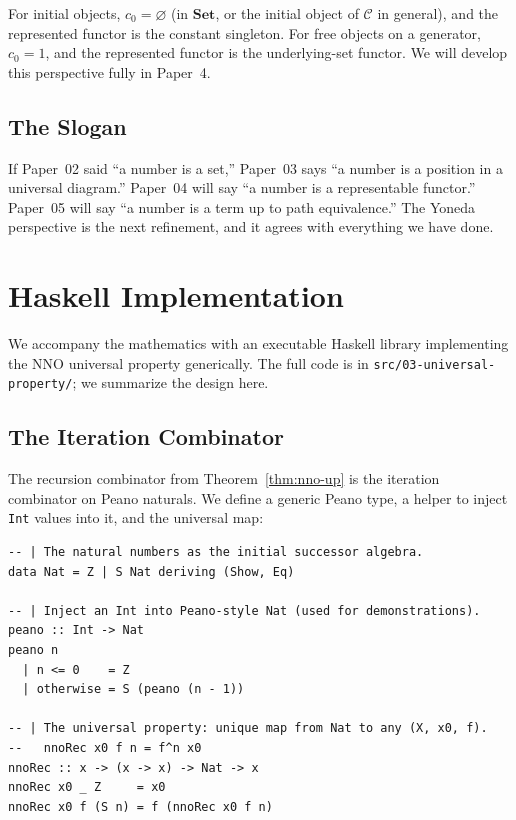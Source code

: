 \documentclass[12pt]{article}
\theoremstyle{definition}
\theoremstyle{remark}
\newcommand{\Set}{\mathbf{Set}}
\begin{document}
For initial objects, $c_0 = \varnothing$ (in $\Set$, or the initial object of $\mathcal{C}$ in general), and the represented functor is the constant singleton. For free objects on a generator, $c_0 = 1$, and the represented functor is the underlying-set functor. We will develop this perspective fully in Paper~4.

\subsection{The Slogan}

If Paper~02 said ``a number is a set,'' Paper~03 says ``a number is a position in a universal diagram.'' Paper~04 will say ``a number is a representable functor.'' Paper~05 will say ``a number is a term up to path equivalence.'' The Yoneda perspective is the next refinement, and it agrees with everything we have done.

\section{Haskell Implementation}
\label{sec:haskell}

We accompany the mathematics with an executable Haskell library implementing the NNO universal property generically. The full code is in \texttt{src/03-universal-property/}; we summarize the design here.

\subsection{The Iteration Combinator}

The recursion combinator from Theorem~\ref{thm:nno-up} is the iteration combinator on Peano naturals. We define a generic Peano type, a helper to inject \texttt{Int} values into it, and the universal map:

\begin{lstlisting}
-- | The natural numbers as the initial successor algebra.
data Nat = Z | S Nat deriving (Show, Eq)

-- | Inject an Int into Peano-style Nat (used for demonstrations).
peano :: Int -> Nat
peano n
  | n <= 0    = Z
  | otherwise = S (peano (n - 1))

-- | The universal property: unique map from Nat to any (X, x0, f).
--   nnoRec x0 f n = f^n x0
nnoRec :: x -> (x -> x) -> Nat -> x
nnoRec x0 _ Z     = x0
nnoRec x0 f (S n) = f (nnoRec x0 f n)
\end{lstlisting}
\end{document}

